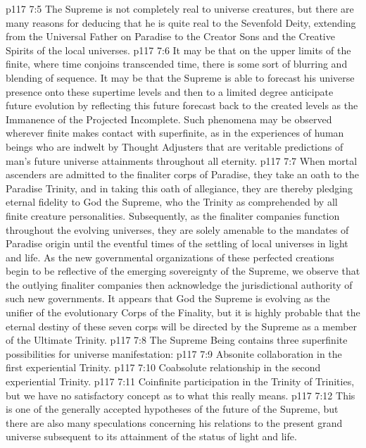 \pc \vs p117 7:5 \bibnobreakspace The Supreme is not completely real to universe creatures, but there are many reasons for deducing that he is quite real to the Sevenfold Deity, extending from the Universal Father on Paradise to the Creator Sons and the Creative Spirits of the local universes.
\pc \vs p117 7:6 It may be that on the upper limits of the finite, where time conjoins transcended time, there is some sort of blurring and blending of sequence. It may be that the Supreme is able to forecast his universe presence onto these supertime levels and then to a limited degree anticipate future evolution by reflecting this future forecast back to the created levels as the Immanence of the Projected Incomplete. Such phenomena may be observed wherever finite makes contact with superfinite, as in the experiences of human beings who are indwelt by Thought Adjusters that are veritable predictions of man’s future universe attainments throughout all eternity.
\pc \vs p117 7:7 When mortal ascenders are admitted to the finaliter corps of Paradise, they take an oath to the Paradise Trinity, and in taking this oath of allegiance, they are thereby pledging eternal fidelity to God the Supreme, who  the Trinity as comprehended by all finite creature personalities. Subsequently, as the finaliter companies function throughout the evolving universes, they are solely amenable to the mandates of Paradise origin until the eventful times of the settling of local universes in light and life. As the new governmental organizations of these perfected creations begin to be reflective of the emerging sovereignty of the Supreme, we observe that the outlying finaliter companies then acknowledge the jurisdictional authority of such new governments. It appears that God the Supreme is evolving as the unifier of the evolutionary Corps of the Finality, but it is highly probable that the eternal destiny of these seven corps will be directed by the Supreme as a member of the Ultimate Trinity.
\pc \vs p117 7:8 The Supreme Being contains three superfinite possibilities for universe manifestation:
\pc \vs p117 7:9 \bibnobreakspace Absonite collaboration in the first experiential Trinity.
\vs p117 7:10 \bibnobreakspace Coabsolute relationship in the second experiential Trinity.
\vs p117 7:11 \bibnobreakspace Coinfinite participation in the Trinity of Trinities, but we have no satisfactory concept as to what this really means.
\pc \vs p117 7:12 This is one of the generally accepted hypotheses of the future of the Supreme, but there are also many speculations concerning his relations to the present grand universe subsequent to its attainment of the status of light and life.
